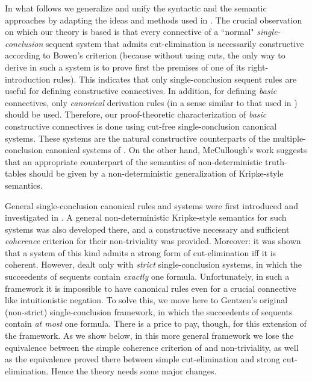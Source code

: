 \documentclass{LMCS}
\theoremstyle{remark}
\begin{document}
In what follows we generalize and unify the 
syntactic and the semantic approaches by adapting
the ideas and methods used in \cite{AL05}. 
The crucial observation on which our theory is based is that every
connective of a ``normal" {\em single-conclusion} sequent system
that admits cut-elimination is necessarily constructive 
according to Bowen's criterion (because without using
cuts, the only way to derive 
in such a system is to prove first the premises of one of 
its right-introduction rules). 
This indicates that only single-conclusion sequent rules are 
useful for defining constructive connectives.
In addition, for defining {\em basic} connectives, 
only {\em canonical} derivation rules (in a sense similar to that used 
in \cite{AL05}) 
should be used.
Therefore, our proof-theoretic characterization
of {\em basic} constructive connectives is done using 
cut-free single-conclusion canonical systems. 
These systems are the natural constructive counterparts of the 
multiple-conclusion canonical systems of \cite{AL05}.
On the other hand,
McCullough's work suggests that 
an appropriate counterpart of the semantics of non-deterministic truth-tables 
should be given by a non-deterministic generalization 
of Kripke-style semantics.



General single-conclusion canonical rules and systems were first introduced 
and investigated in \cite{AL10}. 
A general non-deterministic Kripke-style semantics for such systems 
was also developed there, and a constructive necessary and
sufficient {\em coherence} criterion 
for their non-triviality was provided. Moreover: it was shown
that a system of this
kind admits a strong form of cut-elimination iff it is coherent. 
However, \cite{AL10} dealt only with {\em strict} single-conclusion systems,
in which the succeedents of sequents contain {\em exactly} one formula.
Unfortunately, in such a framework it is impossible to have canonical rules even 
for a crucial connective like intuitionistic  negation.
To solve this, we move here to Gentzen's original 
(non-strict) single-conclusion framework, 
in which the succeedents of sequents contain {\em at most} one formula. 
There is a price to pay, though, for this extension of the framework. 
As we show below, in this more general framework we lose
the equivalence between the simple coherence criterion
of \cite{AL05,AL10} and non-triviality,
as well as the equivalence proved there between simple cut-elimination and strong cut-elimination.
Hence the theory needs some major changes.
\end{document}
